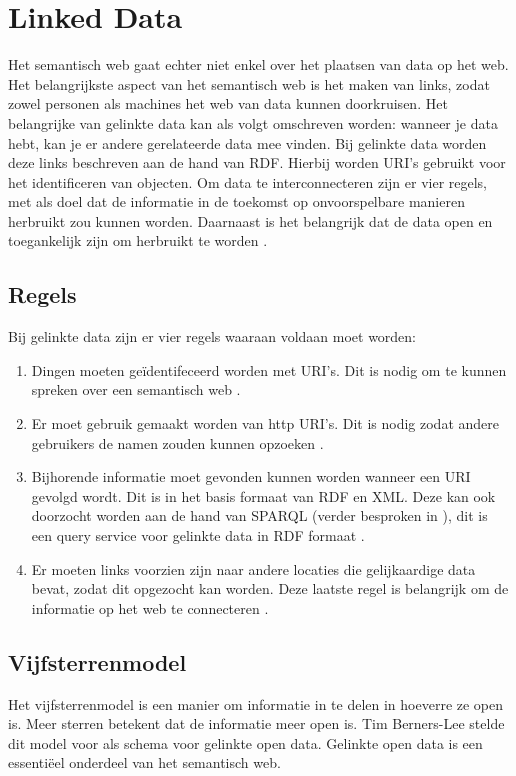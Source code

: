 \section{Linked Data}
\label{sec:linked_data}

Het semantisch web gaat echter niet enkel over het plaatsen van data op het web. Het belangrijkste aspect van het semantisch web is het maken van links, zodat zowel personen als machines het web van data kunnen doorkruisen. Het belangrijke van gelinkte data kan als volgt omschreven worden: wanneer je data hebt, kan je er andere gerelateerde data mee vinden. Bij gelinkte data worden deze links beschreven aan de hand van RDF. Hierbij worden URI's gebruikt voor het identificeren van objecten. Om data te interconnecteren zijn er vier regels, met als doel dat de informatie in de toekomst op onvoorspelbare manieren herbruikt zou kunnen worden. Daarnaast is het belangrijk dat de data open en toegankelijk zijn om herbruikt te worden \cite{berners2006linkeddata}. 

\subsection{Regels}
Bij gelinkte data zijn er vier regels waaraan voldaan moet worden:
\begin{enumerate}
    \item Dingen moeten geïdentifeceerd worden met URI's. Dit is nodig om te kunnen spreken over een semantisch web \cite{berners2006linkeddata}. 
    \item Er moet gebruik gemaakt worden van \acrfull{http} URI's. Dit is nodig zodat andere gebruikers de namen zouden kunnen opzoeken \cite{berners2006linkeddata}. 
    \item Bijhorende informatie moet gevonden kunnen worden wanneer een URI gevolgd wordt. Dit is in het basis formaat van RDF en XML. Deze kan ook doorzocht worden aan de hand van SPARQL (verder besproken in ), dit is een query service voor gelinkte data in RDF formaat \cite{berners2006linkeddata}. 
    \item Er moeten links voorzien zijn naar andere locaties die gelijkaardige data bevat, zodat dit opgezocht kan worden. Deze laatste regel is belangrijk om de informatie op het web te connecteren \cite{berners2006linkeddata}.
\end{enumerate}

\subsection{Vijfsterrenmodel}
Het vijfsterrenmodel is een manier om informatie in te delen in hoeverre ze open is. Meer sterren betekent dat de informatie meer open is. Tim Berners-Lee stelde dit model voor als schema voor gelinkte open data. Gelinkte open data is een essentiëel onderdeel van het semantisch web.

